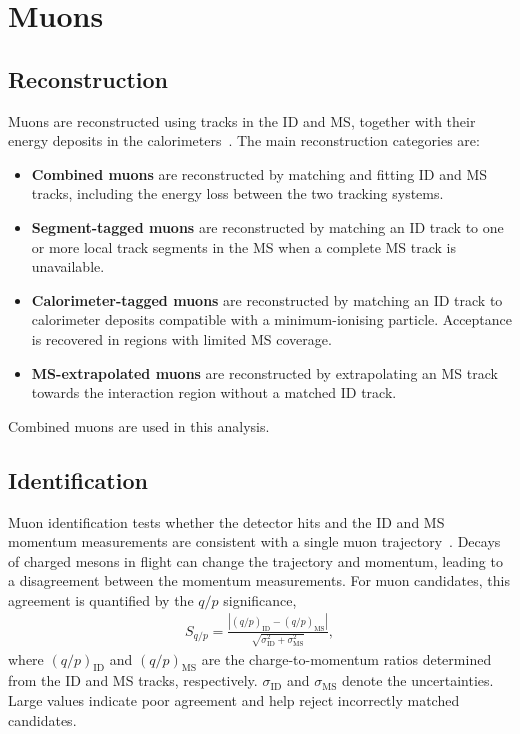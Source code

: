 \section{Muons}
\label{sec:ch6_muons}

\subsection{Reconstruction}

Muons are reconstructed using tracks in the ID and MS, together with their energy deposits in the calorimeters~\cite{ATLAS2021MuonID}.
The main reconstruction categories are:
\begin{itemize}
    \item \textbf{Combined muons} are reconstructed by matching and fitting ID and MS tracks, including the energy loss between the two tracking systems.
    \item \textbf{Segment-tagged muons} are reconstructed by matching an ID track to one or more local track segments in the MS when a complete MS track is unavailable.
    \item \textbf{Calorimeter-tagged muons} are reconstructed by matching an ID track to calorimeter deposits compatible with a minimum-ionising particle. Acceptance is recovered in regions with limited MS coverage.
    \item \textbf{MS-extrapolated muons} are reconstructed by extrapolating an MS track towards the interaction region without a matched ID track.
\end{itemize}

Combined muons are used in this analysis.

\subsection{Identification}

Muon identification tests whether the detector hits and the ID and MS momentum measurements are consistent with a single muon trajectory~\cite{ATLAS2021MuonID}.
Decays of charged mesons in flight can change the trajectory and momentum, leading to a disagreement between the momentum measurements.
For muon candidates, this agreement is quantified by the $q/p$ significance,
\begin{align}
    S_{q/p}=\frac{\left|(q/p)_{\mathrm{ID}}-(q/p)_{\mathrm{MS}}\right|}
    {\sqrt{\sigma_{\mathrm{ID}}^2+\sigma_{\mathrm{MS}}^2}},
    \label{eq:ch6_muon_qp_significance}
\end{align}
where $(q/p)_{\mathrm{ID}}$ and $(q/p)_{\mathrm{MS}}$ are the charge-to-momentum ratios determined from the ID and MS tracks, respectively.
$\sigma_{\mathrm{ID}}$ and $\sigma_{\mathrm{MS}}$ denote the uncertainties.
Large values indicate poor agreement and help reject incorrectly matched candidates.

